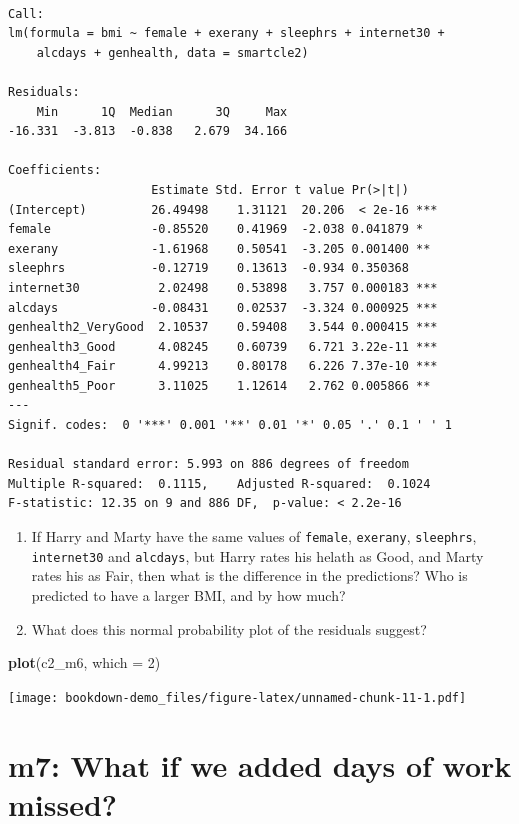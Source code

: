 \documentclass[]{book}
\newenvironment{Shaded}{\begin{snugshade}}{\end{snugshade}}
\newcommand{\KeywordTok}[1]{\textcolor[rgb]{0.13,0.29,0.53}{\textbf{#1}}}
\newcommand{\DataTypeTok}[1]{\textcolor[rgb]{0.13,0.29,0.53}{#1}}
\newcommand{\DecValTok}[1]{\textcolor[rgb]{0.00,0.00,0.81}{#1}}
\newcommand{\NormalTok}[1]{#1}
\theoremstyle{definition}
\theoremstyle{definition}
\theoremstyle{definition}
\theoremstyle{remark}
\begin{document}
\begin{verbatim}

Call:
lm(formula = bmi ~ female + exerany + sleephrs + internet30 + 
    alcdays + genhealth, data = smartcle2)

Residuals:
    Min      1Q  Median      3Q     Max 
-16.331  -3.813  -0.838   2.679  34.166 

Coefficients:
                    Estimate Std. Error t value Pr(>|t|)    
(Intercept)         26.49498    1.31121  20.206  < 2e-16 ***
female              -0.85520    0.41969  -2.038 0.041879 *  
exerany             -1.61968    0.50541  -3.205 0.001400 ** 
sleephrs            -0.12719    0.13613  -0.934 0.350368    
internet30           2.02498    0.53898   3.757 0.000183 ***
alcdays             -0.08431    0.02537  -3.324 0.000925 ***
genhealth2_VeryGood  2.10537    0.59408   3.544 0.000415 ***
genhealth3_Good      4.08245    0.60739   6.721 3.22e-11 ***
genhealth4_Fair      4.99213    0.80178   6.226 7.37e-10 ***
genhealth5_Poor      3.11025    1.12614   2.762 0.005866 ** 
---
Signif. codes:  0 '***' 0.001 '**' 0.01 '*' 0.05 '.' 0.1 ' ' 1

Residual standard error: 5.993 on 886 degrees of freedom
Multiple R-squared:  0.1115,    Adjusted R-squared:  0.1024 
F-statistic: 12.35 on 9 and 886 DF,  p-value: < 2.2e-16
\end{verbatim}

\begin{enumerate}
\def\labelenumi{\arabic{enumi}.}
\item
  If Harry and Marty have the same values of \texttt{female},
  \texttt{exerany}, \texttt{sleephrs}, \texttt{internet30} and
  \texttt{alcdays}, but Harry rates his helath as Good, and Marty rates
  his as Fair, then what is the difference in the predictions? Who is
  predicted to have a larger BMI, and by how much?
\item
  What does this normal probability plot of the residuals suggest?
\end{enumerate}

\begin{Shaded}
\begin{Highlighting}[]
\KeywordTok{plot}\NormalTok{(c2_m6, }\DataTypeTok{which =} \DecValTok{2}\NormalTok{)}
\end{Highlighting}
\end{Shaded}

\texttt{[image: bookdown-demo\_files/figure-latex/unnamed-chunk-11-1.pdf]}

\section{m7: What if we added days of work
missed?}\label{m7-what-if-we-added-days-of-work-missed}
\end{document}
